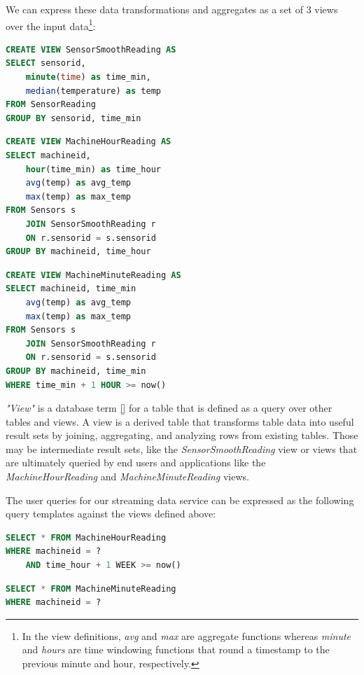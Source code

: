 \documentclass[	DIV=calc,%
							paper=letter,%
							fontsize=11pt,%
							twocolumn]{scrartcl}	 					%
\begin{document}
We can express these data transformations and aggregates as a set of 3 views over the input data\footnote{In the view definitions, \emph{avg} and \emph{max} are aggregate functions whereas \emph{minute} and \emph{hours} are time windowing functions that round a timestamp to the previous minute and hour, respectively.}:

\begin{lstlisting}[language=SQL]
CREATE VIEW SensorSmoothReading AS
SELECT sensorid,
    minute(time) as time_min,
    median(temperature) as temp
FROM SensorReading
GROUP BY sensorid, time_min
\end{lstlisting}

\begin{lstlisting}[language=SQL]
CREATE VIEW MachineHourReading AS
SELECT machineid,
    hour(time_min) as time_hour
    avg(temp) as avg_temp
    max(temp) as max_temp
FROM Sensors s
    JOIN SensorSmoothReading r
    ON r.sensorid = s.sensorid
GROUP BY machineid, time_hour
\end{lstlisting}

\begin{lstlisting}[language=SQL]
CREATE VIEW MachineMinuteReading AS
SELECT machineid, time_min
    avg(temp) as avg_temp
    max(temp) as max_temp
FROM Sensors s
    JOIN SensorSmoothReading r
    ON r.sensorid = s.sensorid
GROUP BY machineid, time_min
WHERE time_min + 1 HOUR >= now()
\end{lstlisting}

\emph{"View"} is a database term \ref{} for a table that is defined as a query over other tables and views. A view is a derived table that transforms table data into useful result sets by joining, aggregating, and analyzing rows from existing tables. Those may be intermediate result sets, like the \emph{SensorSmoothReading} view or views that are ultimately queried by end users and applications like the \emph{MachineHourReading} and \emph{MachineMinuteReading} views.

The user queries for our streaming data service can be expressed as the following query templates against the views defined above:

\begin{lstlisting}[language=SQL]
SELECT * FROM MachineHourReading
WHERE machineid = ?
    AND time_hour + 1 WEEK >= now()
\end{lstlisting}
\begin{lstlisting}[language=SQL]
SELECT * FROM MachineMinuteReading
WHERE machineid = ?
\end{lstlisting}
\end{document}
